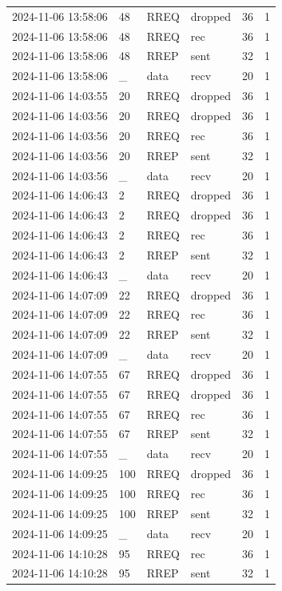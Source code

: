 \documentclass[]{nsm-thesis}
\begin{document}
\begin{longtable}{llllll}
2024-11-06 13:58:06 & 48 & RREQ & dropped & 36 & 1 \\
2024-11-06 13:58:06 & 48 & RREQ & rec & 36 & 1 \\
2024-11-06 13:58:06 & 48 & RREP & sent & 32 & 1 \\
2024-11-06 13:58:06 & _ & data & recv & 20 & 1 \\
2024-11-06 14:03:55 & 20 & RREQ & dropped & 36 & 1 \\
2024-11-06 14:03:56 & 20 & RREQ & dropped & 36 & 1 \\
2024-11-06 14:03:56 & 20 & RREQ & rec & 36 & 1 \\
2024-11-06 14:03:56 & 20 & RREP & sent & 32 & 1 \\
2024-11-06 14:03:56 & _ & data & recv & 20 & 1 \\
2024-11-06 14:06:43 & 2 & RREQ & dropped & 36 & 1 \\
2024-11-06 14:06:43 & 2 & RREQ & dropped & 36 & 1 \\
2024-11-06 14:06:43 & 2 & RREQ & rec & 36 & 1 \\
2024-11-06 14:06:43 & 2 & RREP & sent & 32 & 1 \\
2024-11-06 14:06:43 & _ & data & recv & 20 & 1 \\
2024-11-06 14:07:09 & 22 & RREQ & dropped & 36 & 1 \\
2024-11-06 14:07:09 & 22 & RREQ & rec & 36 & 1 \\
2024-11-06 14:07:09 & 22 & RREP & sent & 32 & 1 \\
2024-11-06 14:07:09 & _ & data & recv & 20 & 1 \\
2024-11-06 14:07:55 & 67 & RREQ & dropped & 36 & 1 \\
2024-11-06 14:07:55 & 67 & RREQ & dropped & 36 & 1 \\
2024-11-06 14:07:55 & 67 & RREQ & rec & 36 & 1 \\
2024-11-06 14:07:55 & 67 & RREP & sent & 32 & 1 \\
2024-11-06 14:07:55 & _ & data & recv & 20 & 1 \\
2024-11-06 14:09:25 & 100 & RREQ & dropped & 36 & 1 \\
2024-11-06 14:09:25 & 100 & RREQ & rec & 36 & 1 \\
2024-11-06 14:09:25 & 100 & RREP & sent & 32 & 1 \\
2024-11-06 14:09:25 & _ & data & recv & 20 & 1 \\
2024-11-06 14:10:28 & 95 & RREQ & rec & 36 & 1 \\
2024-11-06 14:10:28 & 95 & RREP & sent & 32 & 1 \\

\end{longtable}
\end{document}

